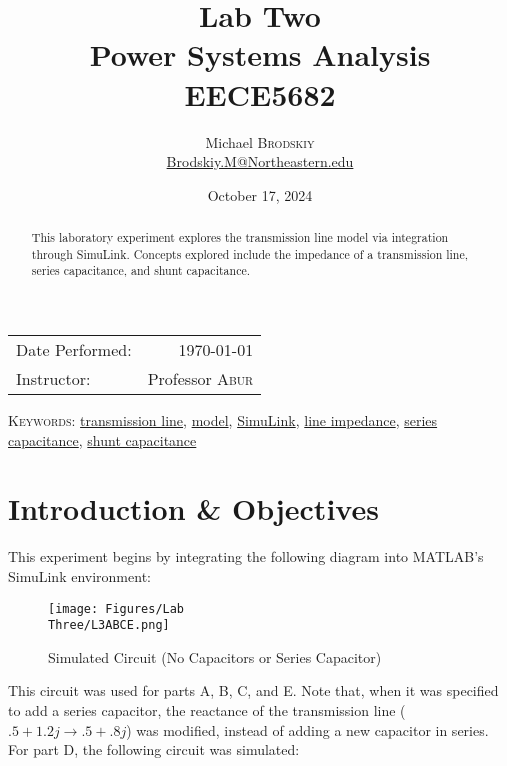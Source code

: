 \documentclass[
	letterpaper, %
	10pt, %
]{CSUniSchoolLabReport}
\title{Lab Two\\ Power Systems Analysis \\ EECE5682} %
\author{Michael \textsc{Brodskiy}\\ \small \href{mailto:Brodskiy.M@Northeastern.edu}{Brodskiy.M@Northeastern.edu}}
\date{October 17, 2024} %
\begin{document}
\maketitle %

\begin{center}
	\begin{tabular}{l r}
		Date Performed: & \today \\ %
		Instructor: & Professor \textsc{Abur} \\ %
	\end{tabular}
\end{center}

\newpage

\begin{abstract}

  This laboratory experiment explores the transmission line model via integration through SimuLink. Concepts explored include the impedance of a transmission line, series capacitance, and shunt capacitance.

\end{abstract}

\begin{flushleft}

  \textsc{Keywords:} \underline{transmission line}, \underline{model}, \underline{SimuLink}, \underline{line impedance}, \underline{series capacitance}, \underline{shunt capacitance}

\end{flushleft}

\newpage

\section{Introduction \& Objectives}

This experiment begins by integrating the following diagram into MATLAB's SimuLink environment:

\begin{figure}[H]
  \centering
  \texttt{[image: Figures/Lab\\ Three/L3ABCE.png]}
  \caption{Simulated Circuit (No Capacitors or Series Capacitor)}
  \label{fig:1}
\end{figure}

This circuit was used for parts A, B, C, and E. Note that, when it was specified to add a series capacitor, the reactance of the transmission line ($.5+1.2j\to.5+.8j$) was modified, instead of adding a new capacitor in series. For part D, the following circuit was simulated:
\end{document}
